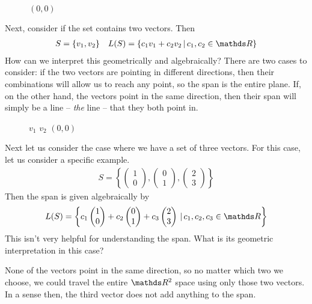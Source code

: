 \documentclass[11pt]{article}
\begin{document}
\begin{figure}[H]
\centering
$(0,0)$
\end{figure}

Next, consider if the set contains two vectors. Then
\begin{align*}
S = \left\{ v_1, v_2 \right\}
&&
L(S) = \left\{ c_1 v_1 + c_2 v_2 \,|\, c_1, c_2 \in \bbR \right\}
\end{align*}
How can we interpret this geometrically and algebraically? There are two cases to consider: if the two vectors are pointing in different directions, then their combinations will allow us to reach any point, so the span is the entire plane. If, on the other hand, the vectors point in the same direction, then their span will simply be a line -- \emph{the} line -- that they both point in.

\begin{figure}[H]
\centering
{$v_1$}
{$v_2$}
$(0,0)$
\end{figure}

Next let us consider the case where we have a set of three vectors. For this case, let us consider a specific example.
\begin{align*}
S = \left\{ \begin{pmatrix}1\\0\end{pmatrix}, \begin{pmatrix}0\\1\end{pmatrix}, \begin{pmatrix}2\\3\end{pmatrix} \right\}
\end{align*}
Then the span is given algebraically by
\begin{align*}
L(S) = \left\{ c_1 \begin{pmatrix}1\\0\end{pmatrix} + c_2 \begin{pmatrix}0\\1\end{pmatrix} + c_3 \begin{pmatrix}2\\3\end{pmatrix} \,|\, c_1, c_2, c_3 \in \bbR \right\}
\end{align*}
This isn't very helpful for understanding the span. What is its geometric interpretation in this case?

None of the vectors point in the same direction, so no matter which two we choose, we could travel the entire $\bbR^2$ space using only those two vectors. In a sense then, the third vector does not add anything to the span.
\end{document}
